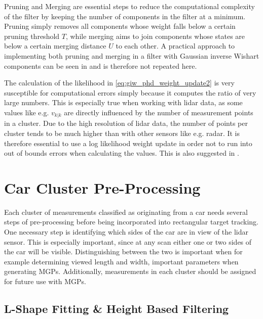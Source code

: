 
Pruning and Merging are essential steps to reduce the computational complexity of the filter by keeping the number of components in the filter at a minimum. Pruning simply removes all components whose weight falls below a certain pruning threshold $T$, while merging aims to join components whose states are below a certain merging distance $U$ to each other. A practical approach to implementing both pruning and merging in a filter with Gaussian inverse Wishart components can be seen in \cite{giwphdtechnical} and is therefore not repeated here.

The calculation of the likelihood in \eqref{eq:giw_phd_weight_update2} is very susceptible for computational errors simply because it computes the ratio of very large numbers. This is especially true when working with lidar data, as some values like e.g. $v_{k|k}$ are directly influenced by the number of measurement points in a cluster. Due to the high resolution of lidar data, the number of points per cluster tends to be much higher than with other sensors like e.g. radar. It is therefore essential to use a log likelihood weight update in order not to run into out of bounds errors when calculating the values. This is also suggested in \cite{giwphdtechnical}.


\section{Car Cluster Pre-Processing}
Each cluster of measurements classified as originating from a car needs several steps of pre-processing before being incorporated into rectangular target tracking. One necessary step is identifying which sides of the car are in view of the lidar sensor. This is especially important, since at any scan either one or two sides of the car will be visible. Distinguishing between the two is important when for example determining viewed length and width, important parameters when generating MGPs. Additionally, measurements in each cluster should be assigned for future use with MGPs.

\subsection{L-Shape Fitting \& Height Based Filtering}

